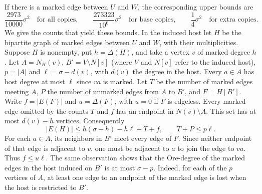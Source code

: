 If there is a marked edge between $U$ and $W$, the corresponding
upper bounds are
\[
 \frac{2973}{10000}\sigma^2\quad\text{for all copies},\qquad
 \frac{273323}{10^6}\sigma^2\quad\text{for base copies},\qquad
 \frac14\sigma^2\quad\text{for extra copies}.
\]
We give the counts that yield these bounds. In the induced host
let $H$ be the bipartite graph of marked edges between $U$ and $W$,
with their multiplicities. Suppose $H$ is nonempty, put $h=\Delta(H)$, and take
a vertex $v$ of marked degree $h$. Let $A=N_H(v)$,
$B'=V\setminus N[v]$ (where $V$ and $N[v]$ refer to the induced
host), $p=|A|$ and $\ell=\sigma-d(v)$, with $d(v)$ the degree in
the host. Every $a\in A$ has host degree at most $\ell$ since $va$
is marked. Let $T$ be the number of marked edges meeting $A$,
$P$ the number of unmarked edges from $A$ to $B'$, and
$F=H[B']$. Write $f=|E(F)|$ and $u=\Delta(F)$, with $u=0$ if
$F$ is edgeless. Every marked edge omitted by the counts $T$ and
$f$ has an endpoint in $N(v)\setminus A$. This set has at most
$d(v)-h$ vertices. Consequently
\[
 |E(H)|\leq h(\sigma-h)-h\ell+T+f,\qquad T+P\leq p\ell .
\]
For each $a\in A$, its neighbors in $B'$ meet every edge of $F$.
Since neither endpoint of that edge is adjacent to $v$, one must
be adjacent to $a$ to join the edge to $va$. Thus $f\leq u\ell$.
The same observation shows that the Ore-degree of the marked edges
in the host induced on $B'$ is at most $\sigma-p$. Indeed, for
each of the $p$ vertices of $A$, at least one edge to an endpoint
of the marked edge is lost when the host is restricted to $B'$.

